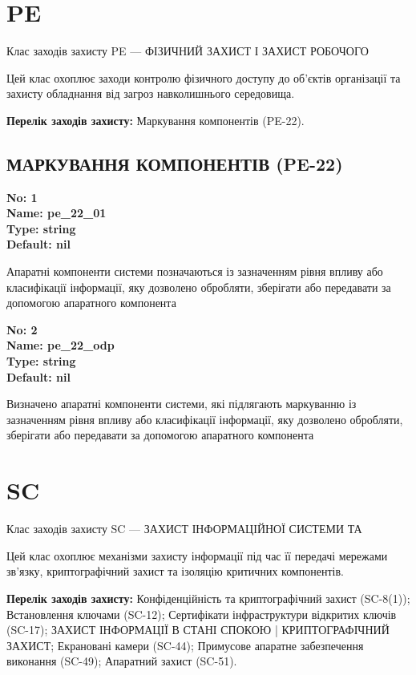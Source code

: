 \documentclass{article}
\begin{document}
\section{PE}
Клас заходів захисту PE --- ФІЗИЧНИЙ ЗАХИСТ І ЗАХИСТ РОБОЧОГО

Цей клас охоплює заходи контролю фізичного доступу до об'єктів організації та захисту обладнання від загроз навколишнього середовища.

\textbf{Перелік заходів захисту:} Маркування компонентів (PE-22).

\subsection{МАРКУВАННЯ КОМПОНЕНТІВ (PE-22)}


\vspace{10pt}
{\footnotesize\bfseries
No: 1\\
Name: pe\_22\_01\\
Type: string\\
Default: nil
}

{\footnotesize Апаратні компоненти системи позначаються із зазначенням рівня впливу або класифікації інформації, яку дозволено обробляти, зберігати або передавати за допомогою апаратного компонента}


{\footnotesize\bfseries
No: 2\\
Name: pe\_22\_odp\\
Type: string\\
Default: nil
}

{\footnotesize Визначено апаратні компоненти системи, які підлягають маркуванню із зазначенням рівня впливу або класифікації інформації, яку дозволено обробляти, зберігати або передавати за допомогою апаратного компонента}




\section{SC}
Клас заходів захисту SC --- ЗАХИСТ ІНФОРМАЦІЙНОЇ СИСТЕМИ ТА

Цей клас охоплює механізми захисту інформації під час її передачі мережами зв'язку, криптографічний захист та ізоляцію критичних компонентів.

\textbf{Перелік заходів захисту:} Конфіденційність та криптографічний захист (SC-8(1)); Встановлення ключами (SC-12); Сертифікати інфраструктури відкритих ключів (SC-17); ЗАХИСТ ІНФОРМАЦІЇ В СТАНІ СПОКОЮ | КРИПТОГРАФІЧНИЙ ЗАХИСТ; Екрановані камери (SC-44); Примусове апаратне забезпечення виконання (SC-49); Апаратний захист (SC-51).
\end{document}
